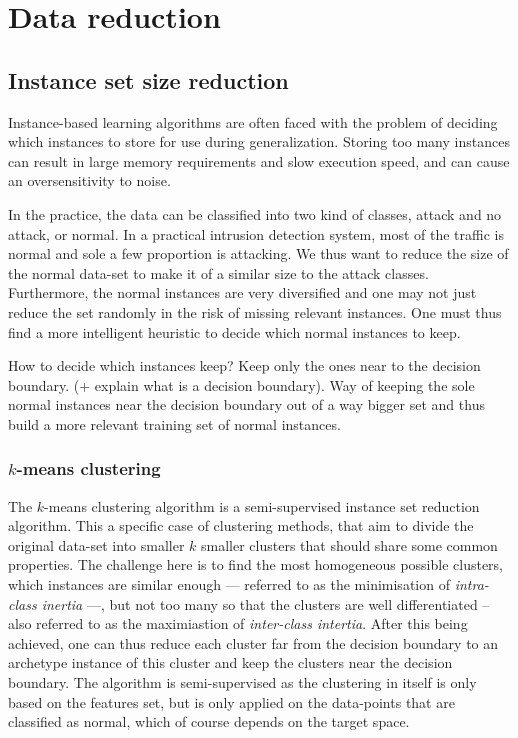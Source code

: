 \section{Data reduction}


\subsection{Instance set size reduction}
Instance-based learning algorithms are often faced with the problem of deciding which instances to store for use during generalization. Storing too many instances can result in large memory requirements and slow execution speed, and can cause an oversensitivity to noise. 

In the practice, the data can be classified into two kind of classes, attack and no attack, or normal. In a practical intrusion detection system, most of the traffic is normal and sole a few proportion is attacking. We thus want to reduce the size of the normal data-set to make it of a similar size to the attack classes. Furthermore, the normal instances are very diversified and one may not just reduce the set randomly in the risk of missing relevant instances. One must thus find a more intelligent heuristic to decide which normal instances to keep.

How to decide which instances keep?
Keep only the ones near to the decision boundary. (+ explain what is a decision boundary). Way of keeping the sole normal instances near the decision boundary out of a way bigger set and thus build a more relevant training set of normal instances.

\subsubsection{$k$-means clustering}
The $k$-means clustering algorithm is a semi-supervised instance set reduction algorithm. This a specific case of clustering methods, that aim to divide the original data-set into smaller $k$ smaller clusters that should share some common properties. The challenge here is to find the most homogeneous possible clusters, which instances are similar enough --- referred to as the minimisation of \emph{intra-class inertia} ---, but not too many so that the clusters are well differentiated -- also referred to as the maximiastion of \emph{inter-class intertia}. After this being achieved, one can thus reduce each cluster far from the decision boundary to an archetype instance of this cluster and keep the clusters near the decision boundary. The algorithm is semi-supervised as the clustering in itself is only based on the features set, but is only applied on the data-points that are classified as normal, which of course depends on the target space.

